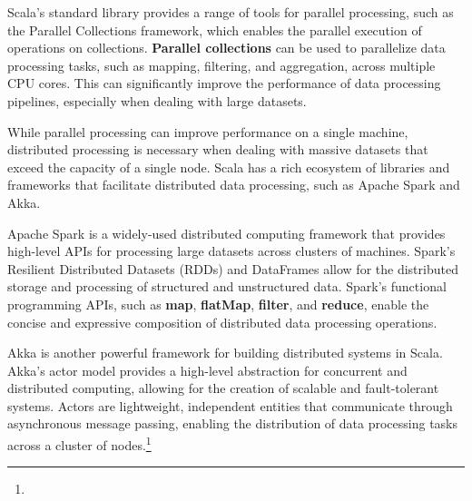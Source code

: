 Scala's standard library provides a range of tools for parallel processing, such as the Parallel Collections framework, which enables the parallel execution of operations on collections. \textbf{Parallel collections} can be used to parallelize data processing tasks, such as mapping, filtering, and aggregation, across multiple CPU cores. This can significantly improve the performance of data processing pipelines, especially when dealing with large datasets.\footnotemark[9]



While parallel processing can improve performance on a single machine, distributed processing is necessary when dealing with massive datasets that exceed the capacity of a single node. Scala has a rich ecosystem of libraries and frameworks that facilitate distributed data processing, such as Apache Spark and Akka.\footnotemark[9]

Apache Spark is a widely-used distributed computing framework that provides high-level APIs for processing large datasets across clusters of machines. Spark's Resilient Distributed Datasets (RDDs) and DataFrames allow for the distributed storage and processing of structured and unstructured data. Spark's functional programming APIs, such as \textbf{map}, \textbf{flatMap}, \textbf{filter}, and \textbf{reduce}, enable the concise and expressive composition of distributed data processing operations.\footnotemark[9]



Akka is another powerful framework for building distributed systems in Scala. Akka's actor model provides a high-level abstraction for concurrent and distributed computing, allowing for the creation of scalable and fault-tolerant systems. Actors are lightweight, independent entities that communicate through asynchronous message passing, enabling the distribution of data processing tasks across a cluster of nodes.\footnote[9]{}


